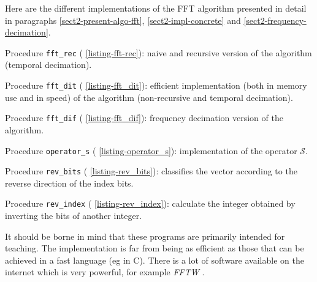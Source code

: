 Here are the different implementations of the FFT algorithm presented in detail in paragraphs \ref{sect2-present-algo-fft}, \ref{sect2-impl-concrete} and \ref{sect2-frequency-decimation}. \begin{rs}
\item Procedure \texttt{fft\_rec} (\listingterme{} \ref{listing-fft-rec}): naive and recursive version of the algorithm (temporal decimation).
\item Procedure \texttt{fft\_dit} (\listingterme{} \ref{listing-fft_dit}): efficient implementation (both in memory use and in speed) of the algorithm (non-recursive and temporal decimation).
\item Procedure \texttt{fft\_dif} (\listingterme{} \ref{listing-fft_dif}): frequency decimation version of the algorithm.
\item Procedure \texttt{operator\_s} (\listingterme{} \ref{listing-operator_s}): implementation of the operator $ \mathcal{S} $.
\item Procedure \texttt{rev\_bits} (\listingterme{} \ref{listing-rev_bits}): classifies the vector according to the reverse direction of the index bits.
\item Procedure \texttt{rev\_index} (\listingterme{} \ref{listing-rev_index}): calculate the integer obtained by inverting the bits of another integer.
\end{rs} It should be borne in mind that these \Matlab{} programs are primarily intended for teaching. The implementation is far from being as efficient as those that can be achieved in a fast language (eg in C). There is a lot of software available on the internet which is very powerful, for example \textit{FFTW} \cite{fftw-software}.

